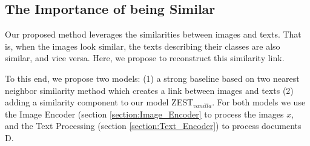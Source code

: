 \documentclass[11pt,a4paper]{article}
\newcommand\gal[1]{\textcolor{bright}{\textbf{GAL:} #1 }}
\newcommand\yuval[1]{\textcolor{darkpink}{\textbf{YUVAL:} #1 }}
\begin{document}
\subsection{The Importance of being Similar}

Our proposed method leverages the similarities between images and texts. That is, when the images look similar, the texts describing their classes are also similar, and vice versa. Here, we propose
to reconstruct this similarity link. 






 To this end, we propose two models: (1) a strong baseline based on two nearest neighbor similarity method which creates a link between images and texts (2) adding a similarity component to our model ZEST$_{vanilla}$.
For both models we use the Image Encoder (section \ref{section:Image_Encoder} to process the images $x$, and the Text Processing (section \ref{section:Text_Encoder}) to process documents D.




%
%



\end{document}

